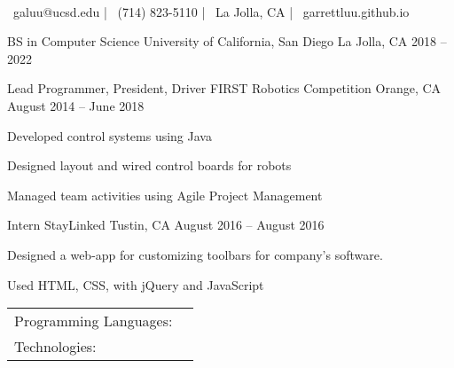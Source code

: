 \documentclass[]{awesome-cv}
\begin{document}
    
\begin{center}
	  \\
	\vspace{2mm}
	{\faEnvelope\ galuu@ucsd.edu} | {\faMobile\ (714) 823-5110} | {\faMapMarker\ La Jolla, CA} | {\faLink\ garrettluu.github.io}
\end{center}
\begin{cventries}
	\cventry
	{BS in Computer Science}
	{University of California, San Diego}
	{La Jolla, CA}
	{2018 – 2022}
	{}
\end{cventries}

\vspace{-2mm}
\begin{cventries}
	\cventry
	{Lead Programmer, President, Driver}
	{FIRST Robotics Competition}
	{Orange, CA}
	{August 2014 – June 2018}
	{\begin{cvitems}
		\item {Developed control systems using Java}
		\item {Designed layout and wired control boards for robots}
		\item {Managed team activities using Agile Project Management}
		\end{cvitems}}
	\cventry
	{Intern}
	{StayLinked}
	{Tustin, CA}
	{August 2016 – August 2016}
	{\begin{cvitems}
		\item {Designed a web-app for customizing toolbars for company’s software.}
		\item {Used HTML, CSS, with jQuery and JavaScript}
		\end{cvitems}}
\end{cventries}
\begin{cventries}
	\cventry
	{}
	{\def\arraystretch{1.15}{\begin{tabular}{ l l }
		Programming Languages:  & {\skill{ Java, C, Python, Lua, HTML, CSS, Javascript, SQL, jQuery, Kotlin}} \\
		Technologies:  & {\skill{ Git, Linux/Unix, Vim, Pytorch, PID}} \\
		\end{tabular}}}
	{}
	{}
	{}
\end{cventries}
\end{document}
